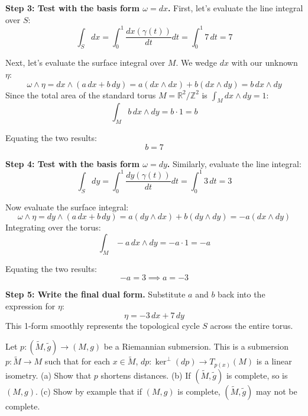 \begin{solution}
\textbf{Step 3: Test with the basis form $\omega = dx$.}
First, let's evaluate the line integral over $S$:
\[ \int_S dx = \int_0^1 \frac{dx(\gamma(t))}{dt} dt = \int_0^1 7 \, dt = 7 \]

Next, let's evaluate the surface integral over $M$. We wedge $dx$ with our unknown $\eta$:
\[ \omega \wedge \eta = dx \wedge (a\,dx + b\,dy) = a(dx \wedge dx) + b(dx \wedge dy) = b\,dx \wedge dy \]
Since the total area of the standard torus $M = \mathbb{R}^2 / \mathbb{Z}^2$ is $\int_M dx \wedge dy = 1$:
\[ \int_M b\,dx \wedge dy = b \cdot 1 = b \]

Equating the two results:
\[ b = 7 \]

\textbf{Step 4: Test with the basis form $\omega = dy$.}
Similarly, evaluate the line integral:
\[ \int_S dy = \int_0^1 \frac{dy(\gamma(t))}{dt} dt = \int_0^1 3 \, dt = 3 \]

Now evaluate the surface integral:
\[ \omega \wedge \eta = dy \wedge (a\,dx + b\,dy) = a(dy \wedge dx) + b(dy \wedge dy) = -a(dx \wedge dy) \]
Integrating over the torus:
\[ \int_M -a\,dx \wedge dy = -a \cdot 1 = -a \]

Equating the two results:
\[ -a = 3 \implies a = -3 \]

\textbf{Step 5: Write the final dual form.}
Substitute $a$ and $b$ back into the expression for $\eta$:
\[ \eta = -3\,dx + 7\,dy \]
This 1-form smoothly represents the topological cycle $S$ across the entire torus.
\end{solution}

\begin{exercise}
\label{geometry:2014:4}
Let $p : (\tilde{M}, \tilde{g}) \to (M, g)$ be a Riemannian submersion. This is a submersion $p : \tilde{M} \to M$ such that for each $x \in \tilde{M}$, $dp : \ker^{\perp}(dp) \to T_{p(x)}(M)$ is a linear isometry.
(a) Show that $p$ shortens distances.
(b) If $(\tilde{M}, \tilde{g})$ is complete, so is $(M, g)$.
(c) Show by example that if $(M, g)$ is complete, $(\tilde{M}, \tilde{g})$ may not be complete.
\end{exercise}

